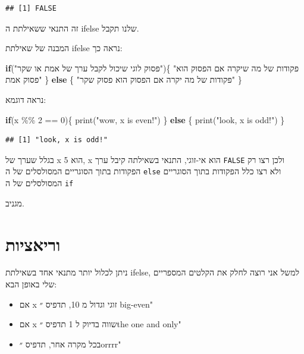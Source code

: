 \documentclass[
]{book}
\newenvironment{Shaded}{\begin{snugshade}}{\end{snugshade}}
\newcommand{\ControlFlowTok}[1]{\textcolor[rgb]{0.13,0.29,0.53}{\textbf{#1}}}
\newcommand{\DecValTok}[1]{\textcolor[rgb]{0.00,0.00,0.81}{#1}}
\newcommand{\FunctionTok}[1]{\textcolor[rgb]{0.00,0.00,0.00}{#1}}
\newcommand{\NormalTok}[1]{#1}
\newcommand{\SpecialCharTok}[1]{\textcolor[rgb]{0.00,0.00,0.00}{#1}}
\newcommand{\StringTok}[1]{\textcolor[rgb]{0.31,0.60,0.02}{#1}}
\providecommand{\tightlist}{%
  \setlength{\itemsep}{0pt}\setlength{\parskip}{0pt}}
\begin{document}
\begin{verbatim}
## [1] FALSE
\end{verbatim}

זה התנאי ששאילתת ה
ifelse
שלנו תקבל.

המבנה של שאילתת
ifelse
נראה כך:

\begin{Shaded}
\begin{Highlighting}[]
\ControlFlowTok{if}\NormalTok{(}\StringTok{"פסוק לוגי שיכול לקבל ערך של אמת או שקר"}\NormalTok{)\{}
  \StringTok{"פקודות של מה שיקרה אם הפסוק הוא פסוק אמת"}
\NormalTok{\} }\ControlFlowTok{else}\NormalTok{ \{}
  \StringTok{"פקודות של מה יקרה אם הפסוק הוא פסוק שקר"}
\NormalTok{\}}
\end{Highlighting}
\end{Shaded}

נראה דוגמא:

\begin{Shaded}
\begin{Highlighting}[]
\ControlFlowTok{if}\NormalTok{(x }\SpecialCharTok{\%\%} \DecValTok{2} \SpecialCharTok{==} \DecValTok{0}\NormalTok{)\{}
  \FunctionTok{print}\NormalTok{(}\StringTok{"wow, x is even!"}\NormalTok{)}
\NormalTok{\} }\ControlFlowTok{else}\NormalTok{ \{}
  \FunctionTok{print}\NormalTok{(}\StringTok{"look, x is odd!"}\NormalTok{)}
\NormalTok{\}}
\end{Highlighting}
\end{Shaded}

\begin{verbatim}
## [1] "look, x is odd!"
\end{verbatim}

בגלל שערך של
x
הוא 5,
x
הוא אי-זוגי,
התנאי בשאילתה קיבל ערך
\texttt{FALSE}
ולכן רצו רק הפקודות בתוך הסוגריים המסולסלים של ה
\texttt{else}
ולא רצו כלל הפקודות בתוך הסוגריים המסולסלים של ה
\texttt{if}

מגניב.

\hypertarget{ux5d5ux5e8ux5d9ux5d0ux5e6ux5d9ux5d5ux5ea}{%
\section{וריאציות}\label{ux5d5ux5e8ux5d9ux5d0ux5e6ux5d9ux5d5ux5ea}}

ניתן לכלול יותר מתנאי אחד בשאילתת
ifelse,
למשל אני רוצה לחלק את הקלטים המספריים שלי באופן הבא:

\begin{itemize}
\tightlist
\item
  אם x זוגי וגדול מ 10, תדפיס ״ big-even"
\item
  אם x שווה בדיוק ל 1 תדפיס ״the one and only"
\item
  בכל מקרה אחר, תדפיס ״orrrr"
\end{itemize}
\end{document}
